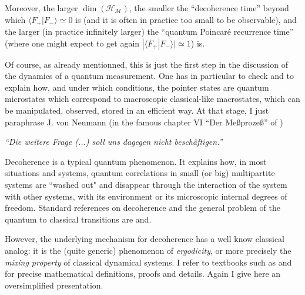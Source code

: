 Moreover, the larger $\dim(\mathcal{H}_\mathcal{M})$, the smaller the ``decoherence time'' beyond which $\langle F_+ | F_-\rangle \simeq 0$ is (and it is often in practice too small to be observable), and the larger (in practice infinitely larger)  the ``quantum Poincar\'{e} recurrence  time'' (where one might expect to get again $|\langle F_+ | F_-\rangle| \simeq  1$) is.


Of course, as already mentionned, this is just the first step in the discussion of the dynamics of a quantum measurement. One has in particular to check and to explain how, and under which conditions, the pointer states are quantum microstates which correspond to macroscopic classical-like macrostates, which can be manipulated, observed, stored in an efficient way. 
At that stage, I just paraphrase J. von Neumann (in the famous  chapter VI  ``Der Me\ss proze\ss '' of  \cite{vonNeumann32G})
\begin{center}
\emph{``Die weitere Frage (...) soll uns dagegen nicht besch\"{a}ftigen.''}
\end{center}

Decoherence is a typical quantum phenomenon. It explains how, in most situations and systems, quantum correlations in small (or big) multipartite systems are ``washed out" and disappear through the interaction of the system with other systems, with its environment or its microscopic  internal degrees of freedom. 
Standard references on decoherence and the general problem of the quantum to classical transitions are  \cite{Zurek:1990fk} and\cite{Schlosshauer07}.

However, the underlying mechanism for decoherence has a well know classical analog: it is the (quite generic) phenomenon of \emph{ergodicity}, or more precisely the \emph{mixing property} of classical dynamical systems.
I refer to textbooks such as \cite{ArnoldAvez-book68} and \cite{LichLieb-book92} for precise mathematical definitions, proofs and details. 
Again I give here an oversimplified presentation.

